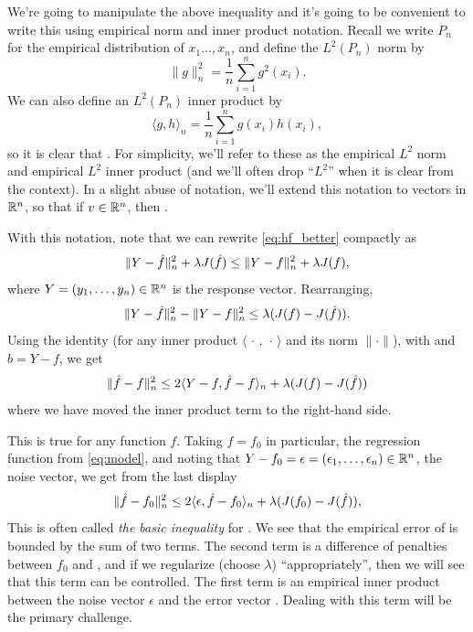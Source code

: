 \documentclass{article}
\begin{document}
We're going to manipulate the above inequality and it's going to be convenient
to write this using empirical norm and inner product notation. Recall we write
$P_n$ for the empirical distribution of $x_1\dots,x_n$, and define the
$L^2(P_n)$ norm by  
\[
\|g\|_n^2 = \frac{1}{n} \sum_{i=1}^n g^2(x_i).
\]
We can also define an $L^2(P_n)$ inner product by 
\[
\langle g, h \rangle_n = \frac{1}{n} \sum_{i=1}^n g(x_i) h(x_i),
\]
so it is clear that . For
simplicity, we'll refer to these as the empirical $L^2$ norm and empirical $L^2$
inner product (and we'll often drop ``$L^2$'' when it is clear from the
context). In a slight abuse of notation, we'll extend this notation to vectors
in $\mathbb{R}^n$, so that if $v \in \mathbb{R}^n$, then .  

With this notation, note that we can rewrite \eqref{eq:hf_better} compactly as 
\[
\|Y - \hat{f}\|_n^2 + \lambda J(\hat{f}) \leq \|Y - f\|_n^2 + \lambda J(f),
\]
where $Y = (y_1,\dots,y_n) \in \mathbb{R}^n$ is the response vector. Rearranging,
\[
\|Y - \hat{f}\|_n^2 - \|Y - f\|_n^2 \leq \lambda (J(f) - J(\hat{f})).
\]
Using the identity 
(for any inner product $\langle \,\cdot\,,  \,\cdot\, \rangle$ and its norm
$\|\cdot\|$), with  and $b = Y - f$, we get
\[
\|\hat{f} - f\|_n^2 \leq 2 \langle Y-f, \hat{f}-f \rangle_n + \lambda (J(f) - J(\hat{f}))
\]
where we have moved the inner product term to the right-hand side. 

This is true for any function $f$. Taking $f = f_0$ in particular, the
regression function from \eqref{eq:model}, and noting that $Y-f_0 = \epsilon = 
(\epsilon_1,\dots,\epsilon_n) \in \mathbb{R}^n$, the noise vector, we get from the last
display 
\begin{equation}
\label{eq:basic_ineq}
\|\hat{f} - f_0\|_n^2 \leq 2 \langle \epsilon, \hat{f}-f_0 \rangle_n + \lambda (J(f_0) -
J(\hat{f})), 
\end{equation}
This is often called \emph{the basic inequality} for \smash{$\hf$}. We see that
the empirical error of \smash{$\hf$} is bounded by the sum of two terms. The
second term is a difference of penalties between $f_0$ and \smash{$\hf$}, and if
we regularize (choose $\lambda$) ``appropriately'', then we will see that this
term can be controlled. The first term is an empirical inner product between the
noise vector $\epsilon$ and the error vector . Dealing with
this term will be the primary challenge.  
\end{document}

